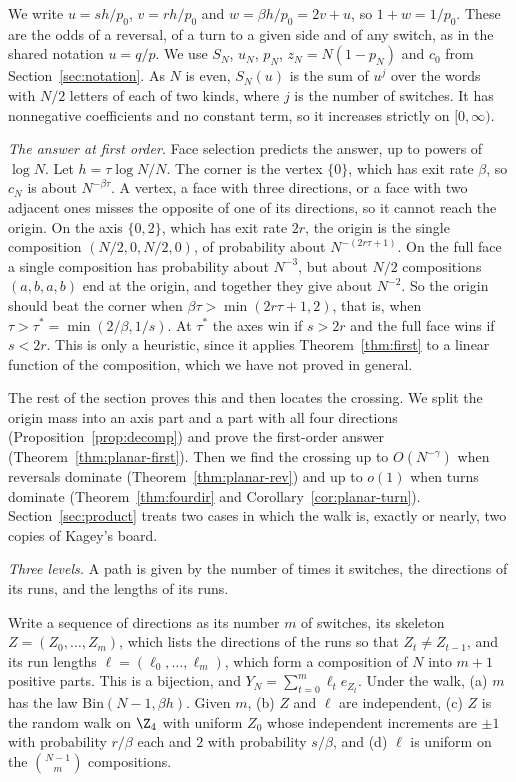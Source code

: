 We write $u=sh/p_0$, $v=rh/p_0$ and $w=\beta h/p_0=2v+u$, so $1+w=1/p_0$. These
are the odds of a reversal, of a turn to a given side and of any switch, as in
the shared notation $u=q/p$. We use $S_N$, $u_N$, $p_N$, $z_N=N(1-p_N)$ and
$c_0$ from Section~\ref{sec:notation}. As $N$ is even, $S_N(u)$ is the sum of
$u^j$ over the words with $N/2$ letters of each of two kinds, where $j$ is the
number of switches. It has nonnegative coefficients and no constant term, so it
increases strictly on $[0,\infty)$.

\emph{The answer at first order.} Face selection predicts the answer, up to
powers of $\log N$. Let $h=\tau\log N/N$. The corner is the vertex $\{0\}$,
which has exit rate $\beta$, so $c_N$ is about $N^{-\beta\tau}$. A vertex, a
face with three directions, or a face with two adjacent ones misses the opposite of
one of its directions, so it cannot reach the origin. On the axis $\{0,2\}$,
which has exit rate $2r$, the origin is the single composition
$(N/2,0,N/2,0)$, of probability about $N^{-(2r\tau+1)}$. On the full face a
single composition has probability about $N^{-3}$, but about $N/2$
compositions $(a,b,a,b)$ end at the origin, and together they give about
$N^{-2}$. So the origin should beat the corner when $\beta\tau>\min(2r\tau+1,2)$,
that is, when $\tau>\tau^*=\min(2/\beta,1/s)$. At $\tau^*$ the axes win if
$s>2r$ and the full face wins if $s<2r$. This is only a heuristic, since it
applies Theorem~\ref{thm:first} to a linear function of the composition, which
we have not proved in general.

The rest of the section proves this and then locates the crossing. We split
the origin mass into an axis part and a part with all four directions
(Proposition~\ref{prop:decomp}) and prove the first-order answer
(Theorem~\ref{thm:planar-first}). Then we find the crossing up to
$O(N^{-\gamma})$ when reversals dominate (Theorem~\ref{thm:planar-rev}) and up
to $o(1)$ when turns dominate (Theorem~\ref{thm:fourdir} and
Corollary~\ref{cor:planar-turn}). Section~\ref{sec:product} treats two cases in
which the walk is, exactly or nearly, two copies of Kagey's board.

\emph{Three levels.} A path is given by the number of times it switches, the
directions of its runs, and the lengths of its runs.

\begin{lemma}\label{lem:threelevel}
Write a sequence of directions as its number $m$ of switches, its skeleton $Z=(Z_0,\dots,Z_m)$,
which lists the directions of the runs so that $Z_t\ne Z_{t-1}$, and its run lengths
$\ell=(\ell_0,\dots,\ell_m)$, which form a composition of $N$ into $m+1$ positive parts. This is a
bijection, and $Y_N=\sum_{t=0}^m\ell_te_{Z_t}$. Under the walk, \textup{(a)} $m$ has the law
$\mathrm{Bin}(N-1,\beta h)$. Given $m$, \textup{(b)} $Z$ and $\ell$ are independent, \textup{(c)}
$Z$ is the random walk on $\Z_4$ with uniform $Z_0$ whose independent increments are $\pm1$ with
probability $r/\beta$ each and $2$ with probability $s/\beta$, and \textup{(d)} $\ell$ is uniform on
the $\binom{N-1}m$ compositions.
\end{lemma}


